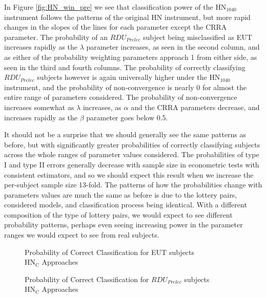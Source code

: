 \documentclass[../main.tex]{subfiles}
\begin{document}
In Figure \ref{fig:HN_win_pre} we see that classification power of the $\text{HN}_{1040}$ instrument follows the patterns of the original HN instrument, but more rapid changes in the slopes of the lines for each parameter except the CRRA parameter.
The probability of an $\mathit{RDU_{Prelec}}$ subject being misclassified as EUT increases rapidly as the $\lambda$ parameter increases, as seen in the second column, and as either of the probability weighting parameters approach 1 from either side, as seen in the third and fourth columns.
The probability of correctly classifying $\mathit{RDU_{Prelec}}$ subjects however is again universally higher under the $\text{HN}_{1040}$ instrument, and the probability of non-convergence is nearly 0 for almost the entire range of parameters considered.
The probability of non-convergence increases somewhat as $\lambda$ increases, as $\alpha$ and the CRRA parameters decrease, and increases rapidly as the $\beta$ parameter goes below 0.5.

It should not be a surprise that we should generally see the same patterns as before, but with significantly greater probabilities of correctly classifying subjects across the whole ranges of parameter values considered.
The probabilities of type I and type II errors generally decrease with sample size in econometric tests with consistent estimators, and so we should expect this result when we increase the per-subject sample size 13-fold.
The patterns of how the probabilities change with parameters values are much the same as before is due to the lottery pairs, considered models, and classification process being identical.
With a different composition of the type of lottery pairs, we would expect to see different probability patterns, perhaps even seeing increasing power in the parameter ranges we would expect to see from real subjects.

\begin{figure}[h!]
	\center
	\caption{Probability of Correct Classification for EUT subjects\\$\text{HN}_\text{C}$ Approaches}
	\label{fig:HNC_correct_eut}
\end{figure}

\begin{figure}[h!]
	\center
	\caption{Probability of Correct Classification for $\mathit{RDU_{Prelec}}$ subjects\\$\text{HN}_\text{C}$ Approaches}
	\label{fig:HNC_correct_pre}
\end{figure}
\end{document}
